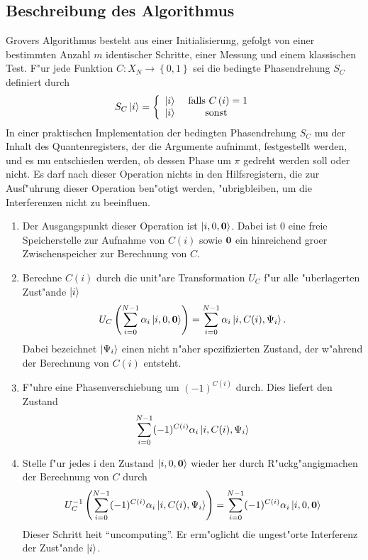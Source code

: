   \subsection{Beschreibung des Algorithmus} 
    Grovers Algorithmus besteht aus einer Initialisierung, gefolgt von einer bestimmten Anzahl $m$ identischer Schritte, 
    einer Messung und einem klassischen Test. F"ur jede Funktion $C:X_N \to \left\{ 0,1\right\}$ sei die bedingte  
    Phasen\-drehung $S_C$ definiert durch 
    $$ S_C \left| i \right> = \left\{ 
                        \begin{array}{cc}
                              \left| i \right> & \mbox{ falls $C\left( i\right) = 1$} \\ 
                              \left| i \right> & \mbox{ sonst }
                        \end{array}
                     \right.
    $$
    In einer praktischen Implementation der bedingten Phasendrehung $S_C$ mu\3 der Inhalt des Quantenregisters, der die Argumente aufnimmt, festgestellt 
    werden, und es mu\3 entschieden werden, ob dessen Phase um $\pi$ gedreht werden soll oder nicht. Es darf nach dieser Operation nichts in den
    Hilfsregistern, die zur Ausf"uhrung dieser Operation ben"otigt werden, "ubrigbleiben, um die Interferenzen nicht zu beeinflu\3en. 
    \begin{enumerate} 
      \item Der Ausgangspunkt dieser Operation ist $\left| i,0,{\bf 0} \right>$.
        Dabei ist $0$ eine freie Speicherstelle zur Aufnahme von $C(i)$ sowie ${\bf 0}$ ein hinreichend gro\3er Zwischenspeicher zur Berechnung  
        von $C$. 
      \item Berechne $C(i)$ durch die unit"are Transformation $U_C$ f"ur alle "uberlagerten Zust"ande $\left| i \right>$ 
        $$ U_C \left( \sum_{i=0}^{N-1} \alpha_i \left| i,0,{\bf 0} \right> \right) = \sum_{i=0}^{N-1} \alpha_i \left| i,C(i),\Psi_i \right>. $$ 
        Dabei bezeichnet $\left| \Psi_i \right>$ einen nicht n"aher spezifizierten Zustand, der w"ahrend der Berechnung von $C(i)$ entsteht. 
      \item F"uhre eine Phasenverschiebung um $(-1)^{C(i)}$ durch. Dies liefert den Zustand 
        $$ \sum_{i=0}^{N-1} (-1)^{C(i)} \alpha_i \left| i,C(i),\Psi_i \right> $$ 
      \item Stelle f"ur jedes i den Zustand $\left| i,0,{\bf 0} \right>$ wieder her durch R"uckg"angigmachen der Berechnung von $C$ durch 
        $$ U_C^{-1} \left( \sum_{i=0}^{N-1} (-1)^{C(i)} \alpha_i \left| i,C(i),\Psi_i \right> \right) =  
           \sum_{i=0}^{N-1}(-1)^{C(i)} \alpha_i \left| i,0,{\bf 0} \right> $$ 
           Dieser Schritt hei\3t "`uncomputing"'. Er erm"oglicht die ungest"orte Interferenz der Zust"ande $\left| i \right>$. 
    \end{enumerate} 
